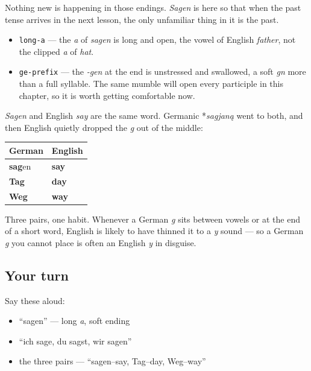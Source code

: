 Nothing new is happening in those endings. \emph{Sagen} is here so that when the past tense arrives in the next lesson, the only unfamiliar thing in it is the past.

\begin{sounds}
\begin{itemize}
\raggedright
  \item \texttt{long-a} — the \emph{a} of \emph{sagen} is long and open, the vowel of English \emph{father}, not the clipped \emph{a} of \emph{hat}.
  \item \texttt{ge-prefix} — the \emph{-gen} at the end is unstressed and swallowed, a soft \emph{gn} more than a full syllable. The same mumble will open every participle in this chapter, so it is worth getting comfortable now.
\end{itemize}
\end{sounds}

\begin{cousinweb}
\emph{Sagen} and English \emph{say} are the same word. Germanic *\emph{sagjaną} went to both, and then English quietly dropped the \emph{g} out of the middle:

\noindent
\begin{tabularx}{\linewidth}{@{}>{\raggedright\arraybackslash}X>{\raggedright\arraybackslash}X@{}}
\toprule
\textbf{German} & \textbf{English} \\
\midrule
\textbf{sag}en & \textbf{say} \\
\textbf{Tag} & \textbf{day} \\
\textbf{Weg} & \textbf{way} \\
\bottomrule
\end{tabularx}

Three pairs, one habit. Whenever a German \emph{g} sits between vowels or at the end of a short word, English is likely to have thinned it to a \emph{y} sound — so a German \emph{g} you cannot place is often an English \emph{y} in disguise.
\end{cousinweb}

\subsection*{Your turn}
Say these aloud:

\begin{itemize}
\raggedright
  \item \textquotedblleft{}sagen\textquotedblright{} — long \emph{a}, soft ending
  \item \textquotedblleft{}ich sage, du sagst, wir sagen\textquotedblright{}
  \item the three pairs — \textquotedblleft{}sagen–say, Tag–day, Weg–way\textquotedblright{}
\end{itemize}

